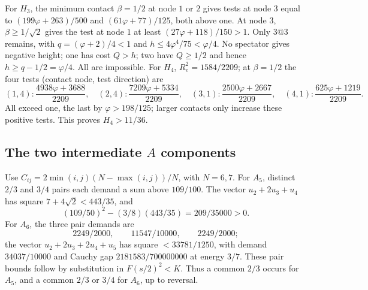 \documentclass[11pt]{article}
\theoremstyle{remark}
\newcommand{\ph}{\varphi}
\begin{document}
For $H_3$, the minimum contact $\beta=1/2$ at node $1$ or $2$
gives tests at node $3$ equal to
$(199\ph+263)/500$ and $(61\ph+77)/125$, both above one.
At node $3$, $\beta\ge1/\sqrt2$ gives the test at node $1$
at least $(27\ph+118)/150>1$. Only $3@3$ remains, with
$q=(\ph+2)/4<1$ and $h\le4\ph^4/75<\ph/4$.
No spectator gives negative height; one has cost $Q>h$; two have
$Q\ge1/2$ and hence $h\ge q-1/2=\ph/4$. All are impossible.
For $H_4$, $R_e^2=1584/2209$; at $\beta=1/2$ the four tests
(contact node, test direction) are
\[
(1,4):\frac{4938\ph+3688}{2209},\quad
(2,4):\frac{7209\ph+5334}{2209},\quad
(3,1):\frac{2500\ph+2667}{2209},\quad
(4,1):\frac{625\ph+1219}{2209}.
\]
All exceed one, the last by $\ph>198/125$; larger contacts only
increase these positive tests. This proves $H_4>11/36$.

\subsection{The two intermediate \texorpdfstring{$A$}{A} components}

Use $C_{ij}=2\min(i,j)(N-\max(i,j))/N$, with $N=6,7$.
For $A_5$, distinct $2/3$ and $3/4$ pairs each demand a sum above
$109/100$. The vector $u_2+2u_3+u_4$ has square
$7+4\sqrt2<443/35$, and
\[
(109/50)^2-(3/8)(443/35)=209/35000>0.
\]
For $A_6$, the three pair demands are
\[
2249/2000,\qquad11547/10000,\qquad2249/2000;
\]
the vector $u_2+2u_3+2u_4+u_5$ has square
$<33781/1250$, with demand $34037/10000$ and Cauchy gap
$2181583/700000000$ at energy $3/7$.
These pair bounds follow by substitution in
$F(s/2)^2<K$. Thus a common $2/3$ occurs for $A_5$, and a common
$2/3$ or $3/4$ for $A_6$, up to reversal.
\end{document}

